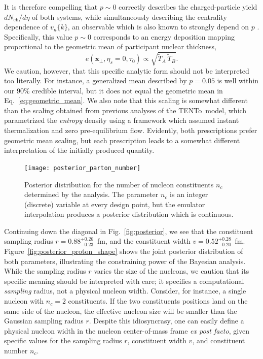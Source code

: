 \documentclass[aps,prc,reprint,amsmath,nofootinbib]{revtex4-1}
\newcommand{\trento}{T\raisebox{-0.5ex}{R}ENTo}
\newcommand{\nch}{N_\text{ch}}
\newcommand{\vnk}[2]{v_#1\{#2\}}
\newcommand{\T}{\tilde{T}}
\newcommand{\xv}{\mathbf x}
\begin{document}
It is therefore compelling that $p \sim 0$ correctly describes the charged-particle yield $d\nch/d\eta$ of both systems, while simultaneously describing the centrality dependence of $\vnk{n}{k}$, an observable which is also known to strongly depend on $p$ \cite{Bernhard:2018hnz}.
Specifically, this value $p \sim 0$ corresponds to an energy deposition mapping proportional to the geometric mean of participant nuclear thickness,
\begin{equation}
  \label{eq:geometric_mean}
  e(\xv_\perp, \eta_s=0, \tau_0) \propto \sqrt{\T_A\, \T_B}.
\end{equation}
We caution, however, that this specific analytic form should not be interpreted too literally.
For instance, a generalized mean described by $p=0.05$ is well within our 90\% credible interval, but it does not equal the geometric mean in Eq.~\eqref{eq:geometric_mean}.
We also note that this scaling is somewhat different than the scaling obtained from previous analyses of the \trento\ model, which parametrized the \emph{entropy} density using a framework which assumed instant thermalization and zero pre-equilibrium flow.
Evidently, both prescriptions prefer geometric mean scaling, but each prescription leads to a somewhat different interpretation of the initially produced quantity.

\begin{figure}
  \texttt{[image: posterior\_parton\_number]}
  \caption{
    \label{fig:posterior_parton_number}
    Posterior distribution for the number of nucleon constituents $n_c$ determined by the analysis.
    The parameter $n_c$ is an integer (discrete) variable at every design point, but the emulator interpolation produces a posterior distribution which is continuous.
  }
\end{figure}

Continuing down the diagonal in Fig.~\ref{fig:posterior}, we see that the constituent sampling radius $r=0.88_{-0.23}^{+0.26}$~fm, and the constituent width $v=0.52_{-0.20}^{+0.28}$~fm.
Figure~\ref{fig:posterior_proton_shape} shows the joint posterior distribution of both parameters, illustrating the constraining power of the Bayesian analysis.
While the sampling radius $r$ varies the size of the nucleons, we caution that its specific meaning should be interpreted with care; it specifies a computational \emph{sampling} radius, not a physical nucleon width.
Consider, for instance, a single nucleon with $n_c = 2$ constituents.
If the two constituents positions land on the same side of the nucleon, the effective nucleon size will be smaller than the Gaussian sampling radius $r$.
Despite this idiosyncrasy, one can easily define a physical nucleon width in the nucleon center-of-mass frame \emph{ex post facto}, given specific values for the sampling radius $r$, constituent width $v$, and constituent number $n_c$.
\end{document}
